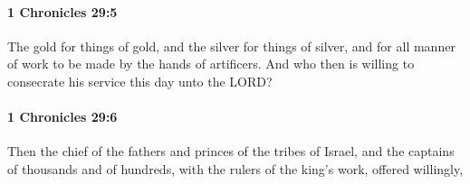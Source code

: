		\paragraph{1 Chronicles 29:5} %
			\label{1CHRONICLES-29-5}

			The gold for things of gold, and the silver for things of silver, and for all manner of work to be made by the hands of artificers. And who then is willing to consecrate his service this day unto the LORD?


		\paragraph{1 Chronicles 29:6} %
			\label{1CHRONICLES-29-6}

			Then the chief of the fathers and princes of the tribes of Israel, and the captains of thousands and of hundreds, with the rulers of the king’s work, offered willingly,

